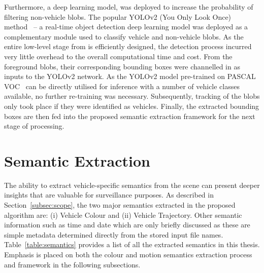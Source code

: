 Furthermore, a deep learning model, was deployed to increase the probability of filtering non-vehicle blobs.
The popular YOLOv2 (You Only Look Once) method~\cite{redmon2016you} -- a real-time object detection deep learning model was deployed as a complementary module used to classify vehicle and non-vehicle blobs.
As the entire low-level stage from \cite{lim2017} is efficiently designed, the detection process incurred very little overhead to the overall computational time and cost.
From the foreground blobs, their corresponding bounding boxes were channelled in as inputs to the YOLOv2 network.
As the YOLOv2 model pre-trained on PASCAL VOC~\cite{everingham2010pascal} can be directly utilised for inference with a number of vehicle classes available, no further re-training was necessary. Subsequently, tracking of the blobs only took place if they were identified as vehicles. Finally, the extracted bounding boxes are then fed into the proposed semantic extraction framework for the next stage of processing.


\section{Semantic Extraction}
\label{section:semanticsExtraction}

The ability to extract vehicle-specific semantics from the scene can present deeper insights that are valuable for surveillance purposes.
As described in Section~\ref{subsec:scope}, the two major semantics extracted in the proposed algorithm are: (i) Vehicle Colour and (ii) Vehicle Trajectory. Other semantic information such as time and date which are only briefly discussed as these are simple metadata determined directly from the stored input file names.
Table~\ref{table:semantics} provides a list of all the extracted semantics in this thesis.
Emphasis is placed on both the colour and motion semantics extraction process and framework in the following subsections.

